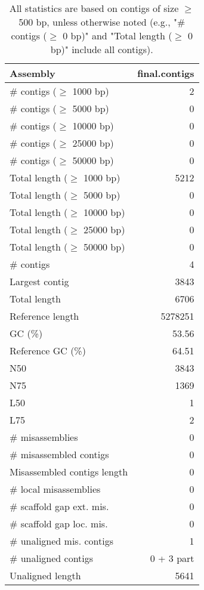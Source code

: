 \documentclass[12pt,a4paper]{article}
\begin{document}
\begin{table}[ht]
\begin{center}
\caption{All statistics are based on contigs of size $\geq$ 500 bp, unless otherwise noted (e.g., "\# contigs ($\geq$ 0 bp)" and "Total length ($\geq$ 0 bp)" include all contigs).}
\begin{tabular}{|l*{1}{|r}|}
\hline
Assembly & final.contigs \\ \hline
\# contigs ($\geq$ 1000 bp) & 2 \\ \hline
\# contigs ($\geq$ 5000 bp) & 0 \\ \hline
\# contigs ($\geq$ 10000 bp) & 0 \\ \hline
\# contigs ($\geq$ 25000 bp) & 0 \\ \hline
\# contigs ($\geq$ 50000 bp) & 0 \\ \hline
Total length ($\geq$ 1000 bp) & 5212 \\ \hline
Total length ($\geq$ 5000 bp) & 0 \\ \hline
Total length ($\geq$ 10000 bp) & 0 \\ \hline
Total length ($\geq$ 25000 bp) & 0 \\ \hline
Total length ($\geq$ 50000 bp) & 0 \\ \hline
\# contigs & 4 \\ \hline
Largest contig & 3843 \\ \hline
Total length & 6706 \\ \hline
Reference length & 5278251 \\ \hline
GC (\%) & 53.56 \\ \hline
Reference GC (\%) & 64.51 \\ \hline
N50 & 3843 \\ \hline
N75 & 1369 \\ \hline
L50 & 1 \\ \hline
L75 & 2 \\ \hline
\# misassemblies & 0 \\ \hline
\# misassembled contigs & 0 \\ \hline
Misassembled contigs length & 0 \\ \hline
\# local misassemblies & 0 \\ \hline
\# scaffold gap ext. mis. & 0 \\ \hline
\# scaffold gap loc. mis. & 0 \\ \hline
\# unaligned mis. contigs & 1 \\ \hline
\# unaligned contigs & 0 + 3 part \\ \hline
Unaligned length & 5641 \\ \hline

\end{tabular}
\end{center}
\end{table}
\end{document}
